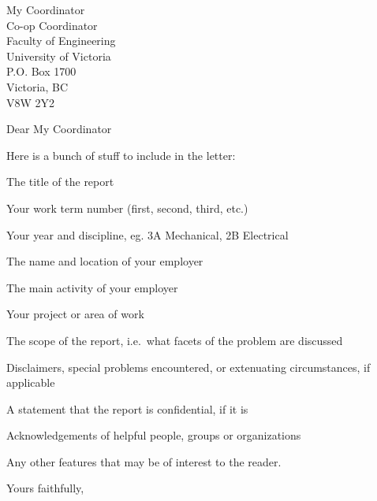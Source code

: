 \documentclass[11pt]{letter}
\begin{document}
\begin{letter}{
	My Coordinator \\
	Co-op Coordinator \\
	Faculty of Engineering \\
	University of Victoria \\
	P.O. Box 1700 \\
	Victoria, BC \\
	V8W 2Y2
}

\opening{Dear My Coordinator}

Here is a bunch of stuff to include in the letter:
\begin{enumerate*}[label= (\roman*)]
	\item The title of the report
	\item  Your work term number (first, second, third, etc.)
	\item  Your year and discipline, eg. 3A Mechanical, 2B Electrical
	\item  The name and location of your employer
	\item  The main activity of your employer
	\item  Your project or area of work
	\item  The scope of the report, i.e.\ what facets of the problem are discussed
	\item  Disclaimers, special problems encountered, or extenuating circumstances, if applicable
	\item  A statement that the report is confidential, if it is
	\item  Acknowledgements of helpful people, groups or organizations
	\item  Any other features that may be of interest to the reader.
\end{enumerate*}

\closing{Yours faithfully,}


\end{letter}
\end{document}
